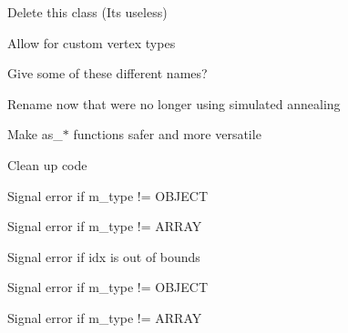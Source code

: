 \begin{DoxyRefList}
\item[\label{todo__todo000010}%
\Hypertarget{todo__todo000010}%
Class \hyperlink{classnta_1_1Sprite}{nta\+:\+:Sprite} ]Delete this class (It\textquotesingle{}s useless)  
\item[\label{todo__todo000011}%
\Hypertarget{todo__todo000011}%
Class \hyperlink{classnta_1_1SpriteBatch}{nta\+:\+:Sprite\+Batch} ]Allow for custom vertex types  
\item[\label{todo__todo000013}%
\Hypertarget{todo__todo000013}%
Member \hyperlink{classnta_1_1SpriteBatch_aa703fb92d0bd42865c21fdfb2625660d}{nta\+:\+:Sprite\+Batch\+:\+:add\+Glyph} (crvec4 pos\+Rect, crvec4 uv\+Rect, G\+Luint texture, float depth=N\+T\+A\+\_\+\+D\+E\+F\+A\+U\+L\+T\+\_\+\+D\+E\+P\+TH, crvec4 color=glm\+::vec4(1))]Give some of these different names?  
\item[\label{todo__todo000028}%
\Hypertarget{todo__todo000028}%
Member \hyperlink{classnta_1_1SpriteFont_a9dc96f31efd0830dcb476ea87534e358}{nta\+:\+:Sprite\+Font\+:\+:Sprite\+Font} (crstring font\+Path, unsigned int size)]Rename now that we\textquotesingle{}re no longer using simulated annealing  
\item[\label{todo__todo000006}%
\Hypertarget{todo__todo000006}%
Class \hyperlink{classnta_1_1utils_1_1Json}{nta\+:\+:utils\+:\+:Json} ]Make as\+\_\+$\ast$ functions safer and more versatile 
\item[\label{todo__todo000022}%
\Hypertarget{todo__todo000022}%
Member \hyperlink{classnta_1_1utils_1_1Json_ab0e60f7a55d12aab005d420c8f924035}{nta\+:\+:utils\+:\+:Json\+:\+:dump} (std\+::size\+\_\+t indent=0, std\+::size\+\_\+t offset=0) const]Clean up code  
\item[\label{todo__todo000016}%
\Hypertarget{todo__todo000016}%
Member \hyperlink{classnta_1_1utils_1_1Json_adf2d340a2bf7d59c537e398a1be66cf7}{nta\+:\+:utils\+:\+:Json\+:\+:operator\mbox{[}\mbox{]}} (crstring key)]Signal error if m\+\_\+type != O\+B\+J\+E\+CT  
\item[\label{todo__todo000018}%
\Hypertarget{todo__todo000018}%
Member \hyperlink{classnta_1_1utils_1_1Json_a236b5885612b74c21fbad169b21eaf55}{nta\+:\+:utils\+:\+:Json\+:\+:operator\mbox{[}\mbox{]}} (std\+::size\+\_\+t idx)]Signal error if m\+\_\+type != A\+R\+R\+AY 

Signal error if idx is out of bounds  
\item[\label{todo__todo000017}%
\Hypertarget{todo__todo000017}%
Member \hyperlink{classnta_1_1utils_1_1Json_ab3b51a07ebed90330c98fd8e20785781}{nta\+:\+:utils\+:\+:Json\+:\+:operator\mbox{[}\mbox{]}} (crstring key) const]Signal error if m\+\_\+type != O\+B\+J\+E\+CT  
\item[\label{todo__todo000020}%
\Hypertarget{todo__todo000020}%
Member \hyperlink{classnta_1_1utils_1_1Json_a893f191111e604995488d147aaa711f8}{nta\+:\+:utils\+:\+:Json\+:\+:operator\mbox{[}\mbox{]}} (std\+::size\+\_\+t idx) const]Signal error if m\+\_\+type != A\+R\+R\+AY 


\end{DoxyRefList}
